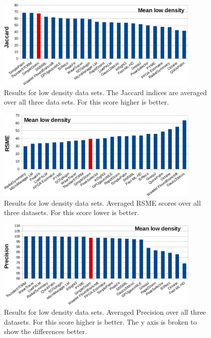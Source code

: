 \begin{figure}
\centering
\includegraphics[width = 0.88\textwidth]{pictures/diagrammsChallenge/MeanLowDensityJaccardCropped.pdf}
	\caption{Results for low density data sets. The Jaccard indices are averaged over all three data sets. For this score higher is better.}
	\label{meanJaccardLowDensity}
\end{figure}

\begin{figure}
\centering
\includegraphics[width = 0.88\textwidth]{pictures/diagrammsChallenge/MeanLowDensityRSMECropped.pdf}
	\caption{Results for low density data sets. Averaged RSME scores over all three datasets. For this score lower is better.}
	\label{meanRSMELowDensity}
\end{figure}

\begin{figure}
\centering
\includegraphics[width = 0.88\textwidth]{pictures/diagrammsChallenge/MeanLowDensityPrecisionCropped.pdf}
	\caption{Results for low density data sets. Averaged Precision over all three datasets. For this score higher is better. The y axis is broken to show the differences better.}
	\label{meanPrecisionLowDensity}
\end{figure}

